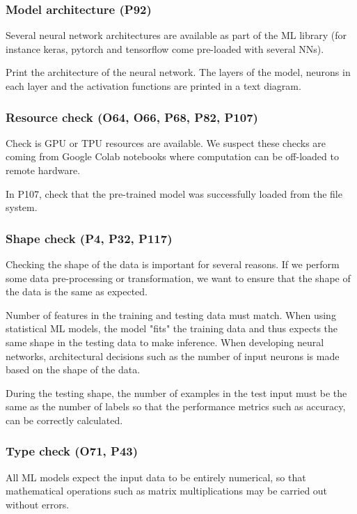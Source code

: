 \subsubsection{Model architecture (P92)}

Several neural network architectures are available as part of the ML library (for instance keras, pytorch and tensorflow come pre-loaded with several NNs).

Print the architecture of the neural network. The layers of the model, neurons in each layer and the activation functions are printed in a text diagram.

\subsubsection{Resource check (O64, O66, P68, P82, P107)}

Check is GPU or TPU resources are available. We suspect these checks are coming from Google Colab notebooks where computation can be off-loaded to remote hardware.

In P107, check that the pre-trained model was successfully loaded from the file system.

\subsubsection{Shape check (P4, P32, P117)}

Checking the shape of the data is important for several reasons. If we perform some data pre-processing or transformation, we want to ensure that the shape of the data is the same as expected.

Number of features in the training and testing data must match. When using statistical ML models, the model "fits" the training data and thus expects the same shape in the testing data to make inference. When developing neural networks, architectural decisions such as the number of input neurons is made based on the shape of the data.

During the testing shape, the number of examples in the test input must be the same as the number of labels so that the performance metrics such as accuracy, can be correctly calculated.

\subsubsection{Type check (O71, P43)}

All ML models expect the input data to be entirely numerical, so that mathematical operations such as matrix multiplications may be carried out without errors.

